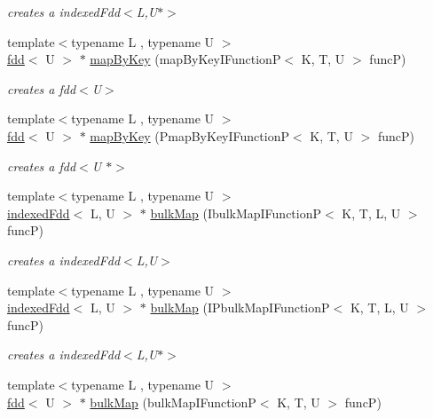 \begin{DoxyCompactItemize}
\begin{DoxyCompactList}\small\item\em creates a indexed\+Fdd$<$\+L,\+U$\ast$$>$ \end{DoxyCompactList}\item 
{\footnotesize template$<$typename L , typename U $>$ }\\\hyperlink{classfaster_1_1fdd}{fdd}$<$ U $>$ $\ast$ \hyperlink{group__bykey_ga993ec5033e2f665437f5d8590794fe0b}{map\+By\+Key} (map\+By\+Key\+I\+FunctionP$<$ K, T, U $>$ funcP)
\begin{DoxyCompactList}\small\item\em creates a fdd$<$\+U$>$ \end{DoxyCompactList}\item 
{\footnotesize template$<$typename L , typename U $>$ }\\\hyperlink{classfaster_1_1fdd}{fdd}$<$ U $>$ $\ast$ \hyperlink{group__bykey_ga558fd453f0a2ba00515359a46690972d}{map\+By\+Key} (Pmap\+By\+Key\+I\+FunctionP$<$ K, T, U $>$ funcP)
\begin{DoxyCompactList}\small\item\em creates a fdd$<$\+U $\ast$$>$ \end{DoxyCompactList}\item 
{\footnotesize template$<$typename L , typename U $>$ }\\\hyperlink{classfaster_1_1indexedFdd}{indexed\+Fdd}$<$ L, U $>$ $\ast$ \hyperlink{group__bulk_ga6ace49d5739205211ba154ada93c5a06}{bulk\+Map} (Ibulk\+Map\+I\+FunctionP$<$ K, T, L, U $>$ funcP)
\begin{DoxyCompactList}\small\item\em creates a indexed\+Fdd$<$\+L,\+U$>$ \end{DoxyCompactList}\item 
{\footnotesize template$<$typename L , typename U $>$ }\\\hyperlink{classfaster_1_1indexedFdd}{indexed\+Fdd}$<$ L, U $>$ $\ast$ \hyperlink{group__bulk_ga2989dde370e2c25e98434249a8cc5130}{bulk\+Map} (I\+Pbulk\+Map\+I\+FunctionP$<$ K, T, L, U $>$ funcP)
\begin{DoxyCompactList}\small\item\em creates a indexed\+Fdd$<$\+L,\+U$\ast$$>$ \end{DoxyCompactList}\item 
{\footnotesize template$<$typename L , typename U $>$ }\\\hyperlink{classfaster_1_1fdd}{fdd}$<$ U $>$ $\ast$ \hyperlink{group__bulk_ga661567a1e05b508619c9399b2149d7d7}{bulk\+Map} (bulk\+Map\+I\+FunctionP$<$ K, T, U $>$ funcP)

\end{DoxyCompactItemize}
